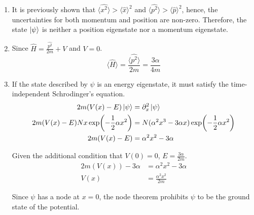 \begin{sol}
\begin{enumerate}[label=\textbf{(\alph*)}]
	\item It is previously shown that $\langle \hat{x^2} \rangle > \langle \hat{x}\rangle^2$ and $\langle \hat{p^2} \rangle > \langle \hat{p}\rangle^2$, hence, the uncertainties for both momentum and position are non-zero. Therefore, the state $\ket{\psi}$ is neither a position eigenstate nor a momentum eigenstate.
	\item Since $\hat{H}=\frac{\hat{p^2}}{2m}+V$ and $V=0$. 
	\begin{equation}
		\langle\hat{H}\rangle=\frac{\langle\hat{p^2}\rangle}{2m}=\frac{3\alpha}{4m}
	\end{equation}
	\item If the state described by $\psi$ is an energy eigenstate, it must satisfy the time-independent Schrodinger's equation.
	\begin{align}
		2m(V(x)-E)\ket\psi&=\partial_x^2\ket\psi\\
		2m(V(x)-E)Nx\exp(-\frac{1}{2}\alpha x^2)&=N(\alpha^2x^3-3\alpha x)\exp(-\frac{1}{2}\alpha x^2)\\
		2m(V(x)-E)&=\alpha^2x^2-3\alpha
	\end{align}

	Given the additional condition that $V(0)=0$, $E=\displaystyle{\frac{3\alpha}{2m}}$.
	\\
	\begin{align}
		2m(V(x))-3\alpha&=\alpha^2x^2-3\alpha\\
		V(x)&=\frac{\alpha^2x^2}{2m}
	\end{align}	
	
	Since $\psi$ has a node at $x=0$, the node theorem prohibits $\psi$ to be the ground state of the potential.
	
\end{enumerate}
\end{sol}